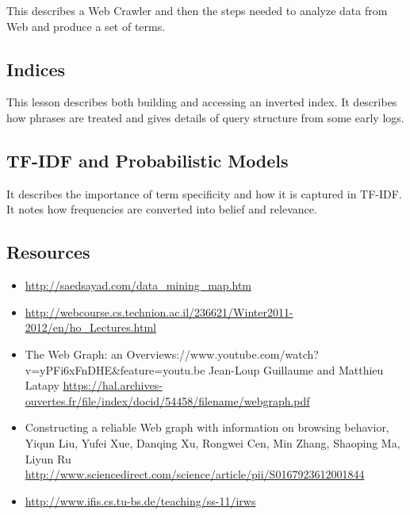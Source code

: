 
This describes a Web Crawler and then the steps needed to analyze data
from Web and produce a set of terms.



\subsection{Indices}\label{indices}


This lesson describes both building and accessing an inverted index. It
describes how phrases are treated and gives details of query structure
from some early logs.



\subsection{TF-IDF and Probabilistic
Models}\label{tf-idf-and-probabilistic-models}


It describes the importance of term specificity and how it is captured
in TF-IDF. It notes how frequencies are converted into belief and
relevance.


\subsection{Resources}

\begin{itemize}

\item
  \url{http://saedsayad.com/data_mining_map.htm}
\item
  \url{http://webcourse.cs.technion.ac.il/236621/Winter2011-2012/en/ho_Lectures.html}
\item
  The Web Graph: an
  Overviews://www.youtube.com/watch?v=yPFi6xFnDHE\&feature=youtu.be
  Jean-Loup Guillaume and Matthieu Latapy
  \url{https://hal.archives-ouvertes.fr/file/index/docid/54458/filename/webgraph.pdf}
\item
  Constructing a reliable Web graph with information on browsing
  behavior, Yiqun Liu, Yufei Xue, Danqing Xu, Rongwei Cen, Min Zhang,
  Shaoping Ma, Liyun Ru
  \url{http://www.sciencedirect.com/science/article/pii/S0167923612001844}
\item
  \url{http://www.ifis.cs.tu-bs.de/teaching/ss-11/irws}
\end{itemize}

